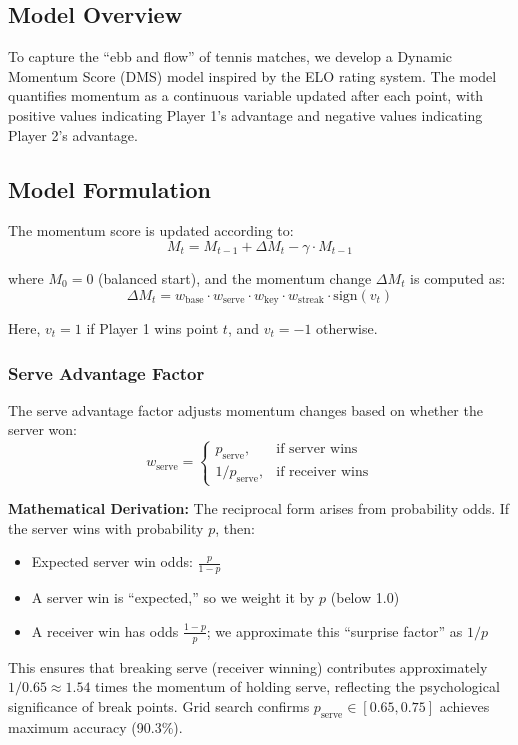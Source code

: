 \documentclass{mcmthesis}
\begin{document}
\subsection{Model Overview}

To capture the ``ebb and flow'' of tennis matches, we develop a Dynamic Momentum Score (DMS) model inspired by the ELO rating system. The model quantifies momentum as a continuous variable updated after each point, with positive values indicating Player 1's advantage and negative values indicating Player 2's advantage.

\subsection{Model Formulation}

The momentum score is updated according to:
\begin{equation}
M_t = M_{t-1} + \Delta M_t - \gamma \cdot M_{t-1}
\label{eq:momentum_update}
\end{equation}

where $M_0 = 0$ (balanced start), and the momentum change $\Delta M_t$ is computed as:
\begin{equation}
\Delta M_t = w_{\text{base}} \cdot w_{\text{serve}} \cdot w_{\text{key}} \cdot w_{\text{streak}} \cdot \text{sign}(v_t)
\label{eq:delta_momentum}
\end{equation}

Here, $v_t = 1$ if Player 1 wins point $t$, and $v_t = -1$ otherwise.

\subsubsection{Serve Advantage Factor}

The serve advantage factor adjusts momentum changes based on whether the server won:
\begin{equation}
w_{\text{serve}} = \begin{cases}
p_{\text{serve}}, & \text{if server wins} \\
1/p_{\text{serve}}, & \text{if receiver wins}
\end{cases}
\end{equation}

\textbf{Mathematical Derivation:} The reciprocal form arises from probability odds. If the server wins with probability $p$, then:
\begin{itemize}
    \item Expected server win odds: $\frac{p}{1-p}$
    \item A server win is ``expected,'' so we weight it by $p$ (below 1.0)
    \item A receiver win has odds $\frac{1-p}{p}$; we approximate this ``surprise factor'' as $1/p$
\end{itemize}
This ensures that breaking serve (receiver winning) contributes approximately $1/0.65 \approx 1.54$ times the momentum of holding serve, reflecting the psychological significance of break points. Grid search confirms $p_{\text{serve}} \in [0.65, 0.75]$ achieves maximum accuracy (90.3\%).
\end{document}
